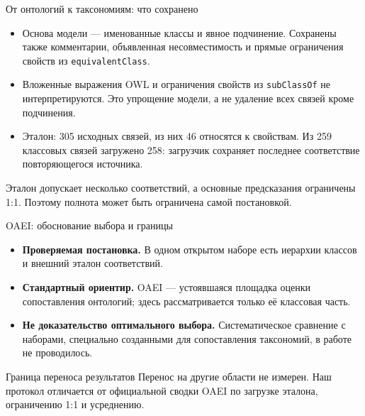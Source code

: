 \documentclass[aspectratio=169,11pt]{beamer}
\begin{document}
\renewcommand{\hseheadertext}{Дополнительные материалы}
\begin{frame}{От онтологий к таксономиям: что сохранено}
  \begin{itemize}
    \item Основа модели --- именованные классы и явное подчинение.
      Сохранены также комментарии, объявленная несовместимость и прямые ограничения свойств из \texttt{equivalentClass}.
    \item Вложенные выражения OWL и ограничения свойств из \texttt{subClassOf} не интерпретируются.
      Это упрощение модели, а не удаление всех связей кроме подчинения.
    \item Эталон: 305 исходных связей, из них 46 относятся к свойствам.
      Из 259 классовых связей загружено 258: загрузчик сохраняет последнее соответствие повторяющегося источника.
  \end{itemize}
  \alert{Эталон допускает несколько соответствий, а основные предсказания ограничены 1:1.
    Поэтому полнота может быть ограничена самой постановкой.}
\end{frame}

\renewcommand{\hseheadertext}{Дополнительные материалы}
\begin{frame}{OAEI: обоснование выбора и границы}
  \begin{itemize}
    \item \textbf{Проверяемая постановка.} В одном открытом наборе есть иерархии классов и внешний эталон соответствий.
    \item \textbf{Стандартный ориентир.} OAEI --- устоявшаяся площадка оценки сопоставления онтологий;
      здесь рассматривается только её классовая часть.
    \item \textbf{Не доказательство оптимального выбора.} Систематическое сравнение с наборами,
      специально созданными для сопоставления таксономий, в работе не проводилось.
  \end{itemize}
  \begin{block}{Граница переноса результатов}
    Перенос на другие области не измерен. Наш протокол отличается
    от официальной сводки OAEI по загрузке эталона, ограничению 1:1 и усреднению.
  \end{block}
\end{frame}
\end{document}
